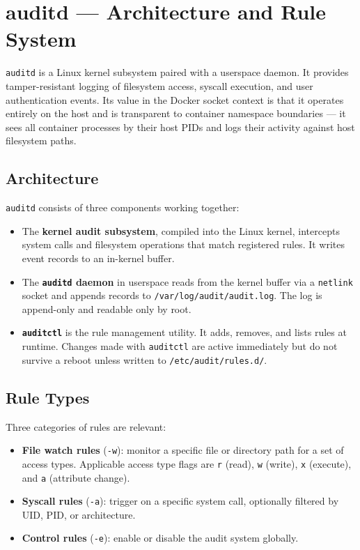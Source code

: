 
\section{auditd --- Architecture and Rule System}

\texttt{auditd} is a Linux kernel subsystem paired with a userspace daemon. It provides tamper-resistant logging of filesystem access, syscall execution, and user authentication events. Its value in the Docker socket context is that it operates entirely on the host and is transparent to container namespace boundaries --- it sees all container processes by their host PIDs and logs their activity against host filesystem paths.

\subsection{Architecture}

\texttt{auditd} consists of three components working together:

\begin{itemize}
    \item The \textbf{kernel audit subsystem}, compiled into the Linux kernel, intercepts system calls and filesystem operations that match registered rules. It writes event records to an in-kernel buffer.
    \item The \textbf{\texttt{auditd} daemon} in userspace reads from the kernel buffer via a \texttt{netlink} socket and appends records to \texttt{/var/log/audit/audit.log}. The log is append-only and readable only by root.
    \item \textbf{\texttt{auditctl}} is the rule management utility. It adds, removes, and lists rules at runtime. Changes made with \texttt{auditctl} are active immediately but do not survive a reboot unless written to \texttt{/etc/audit/rules.d/}.
\end{itemize}

\subsection{Rule Types}

Three categories of rules are relevant:

\begin{itemize}
    \item \textbf{File watch rules} (\texttt{-w}): monitor a specific file or directory path for a set of access types. Applicable access type flags are \texttt{r} (read), \texttt{w} (write), \texttt{x} (execute), and \texttt{a} (attribute change).
    \item \textbf{Syscall rules} (\texttt{-a}): trigger on a specific system call, optionally filtered by UID, PID, or architecture.
    \item \textbf{Control rules} (\texttt{-e}): enable or disable the audit system globally.
\end{itemize}

